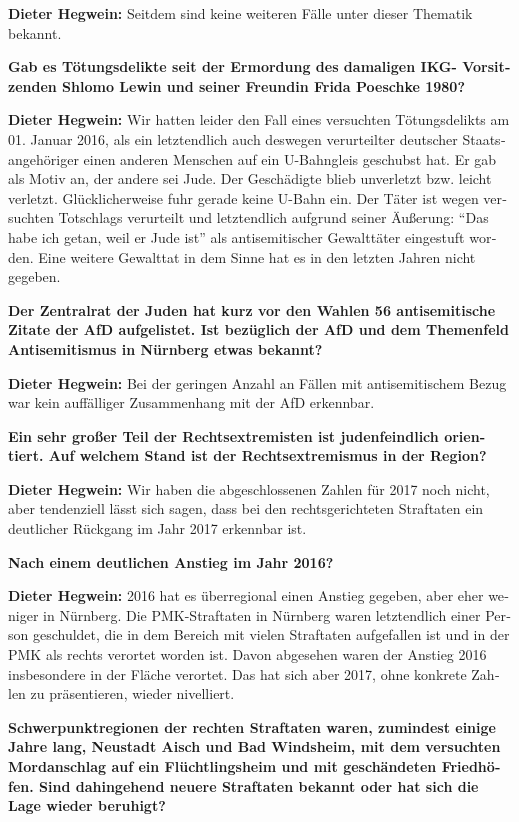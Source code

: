 \begin{otherlanguage}{ngerman}
\textbf{Dieter Hegwein:} Seitdem sind keine weiteren Fälle unter dieser Thematik bekannt.

\textbf{Gab es Tötungsdelikte seit der Ermordung des damaligen IKG- Vorsitzenden Shlomo Lewin und seiner Freundin Frida Poeschke 1980?}

\textbf{Dieter Hegwein:} Wir hatten leider den Fall eines versuchten Tötungsdelikts am 01. Januar 2016, als ein letztendlich auch deswegen verurteilter deutscher Staatsangehöriger einen anderen Menschen auf ein U-Bahngleis geschubst hat. Er gab als Motiv an, der andere sei Jude. Der Geschädigte blieb unverletzt bzw. leicht verletzt. Glücklicherweise fuhr gerade keine U-Bahn ein. Der Täter ist wegen versuchten Totschlags verurteilt und letztendlich aufgrund seiner Äußerung: "`Das habe ich getan, weil er Jude ist"' als antisemitischer Gewalttäter eingestuft worden. Eine weitere Gewalttat in dem Sinne hat es in den letzten Jahren nicht gegeben. 

\textbf{Der Zentralrat der Juden hat kurz vor den Wahlen 56 antisemitische Zitate der AfD aufgelistet. Ist bezüglich der AfD und dem Themenfeld Antisemitismus in Nürnberg etwas bekannt?}

\textbf{Dieter Hegwein:} Bei der geringen Anzahl an Fällen mit antisemitischem Bezug war kein auffälliger Zusammenhang mit der AfD erkennbar. 

\textbf{Ein sehr großer Teil der Rechtsextremisten ist judenfeindlich orientiert. Auf welchem Stand ist der Rechtsextremismus in der Region?}

\textbf{Dieter Hegwein:} Wir haben die abgeschlossenen Zahlen für 2017 noch nicht, aber tendenziell lässt sich sagen, dass bei den rechtsgerichteten Straftaten ein deutlicher Rückgang im Jahr 2017 erkennbar ist.

\textbf{Nach einem deutlichen Anstieg im Jahr 2016?}

\textbf{Dieter Hegwein:} 2016 hat es überregional einen Anstieg gegeben, aber eher weniger in Nürnberg. Die PMK-Straftaten in Nürnberg waren letztendlich einer Person geschuldet, die in dem Bereich mit vielen Straftaten aufgefallen ist und in der PMK als rechts verortet worden ist. Davon abgesehen waren der Anstieg 2016 insbesondere in der Fläche verortet. Das hat sich aber 2017, ohne konkrete Zahlen zu präsentieren, wieder nivelliert.

\textbf{Schwerpunktregionen der rechten Straftaten waren, zumindest einige Jahre lang, Neustadt Aisch und Bad Windsheim, mit dem versuchten Mordanschlag auf ein Flüchtlingsheim und mit geschändeten Friedhöfen. Sind dahingehend neuere Straftaten bekannt oder hat sich die Lage wieder beruhigt?}


\end{otherlanguage}
